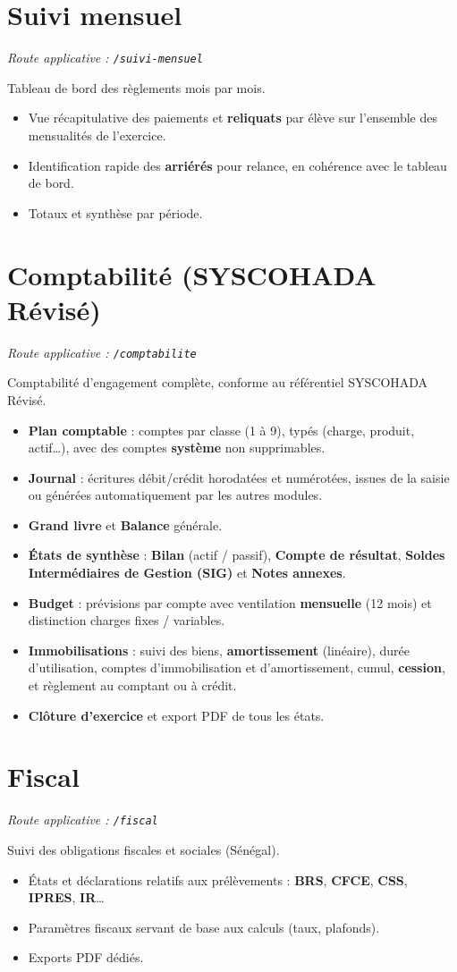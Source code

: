 \documentclass[11pt,a4paper]{report}
\newcommand{\feat}[1]{\item #1}
\newcommand{\modtag}[1]{{\small\color{sagigray}\textit{Route applicative : \texttt{#1}}}}
\begin{document}
\section{Suivi mensuel}
\modtag{/suivi-mensuel}

\noindent Tableau de bord des règlements mois par mois.
\begin{itemize}
\feat{Vue récapitulative des paiements et \textbf{reliquats} par élève sur
l'ensemble des mensualités de l'exercice.}
\feat{Identification rapide des \textbf{arriérés} pour relance, en cohérence
avec le tableau de bord.}
\feat{Totaux et synthèse par période.}
\end{itemize}

\section{Comptabilité (SYSCOHADA Révisé)}
\modtag{/comptabilite}

\noindent Comptabilité d'engagement complète, conforme au référentiel
SYSCOHADA Révisé.
\begin{itemize}
\feat{\textbf{Plan comptable} : comptes par classe (1 à 9), typés
(charge, produit, actif\ldots), avec des comptes \textbf{système} non
supprimables.}
\feat{\textbf{Journal} : écritures débit/crédit horodatées et numérotées,
issues de la saisie ou générées automatiquement par les autres modules.}
\feat{\textbf{Grand livre} et \textbf{Balance} générale.}
\feat{\textbf{États de synthèse} : \textbf{Bilan} (actif / passif),
\textbf{Compte de résultat}, \textbf{Soldes Intermédiaires de Gestion (SIG)}
et \textbf{Notes annexes}.}
\feat{\textbf{Budget} : prévisions par compte avec ventilation \textbf{mensuelle}
(12 mois) et distinction charges fixes / variables.}
\feat{\textbf{Immobilisations} : suivi des biens, \textbf{amortissement}
(linéaire), durée d'utilisation, comptes d'immobilisation et d'amortissement,
cumul, \textbf{cession}, et règlement au comptant ou à crédit.}
\feat{\textbf{Clôture d'exercice} et export PDF de tous les états.}
\end{itemize}

\section{Fiscal}
\modtag{/fiscal}

\noindent Suivi des obligations fiscales et sociales (Sénégal).
\begin{itemize}
\feat{États et déclarations relatifs aux prélèvements : \textbf{BRS},
\textbf{CFCE}, \textbf{CSS}, \textbf{IPRES}, \textbf{IR}\ldots}
\feat{Paramètres fiscaux servant de base aux calculs (taux, plafonds).}
\feat{Exports PDF dédiés.}
\end{itemize}
\end{document}
